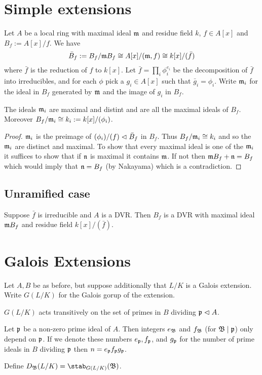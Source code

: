 \documentclass{memoir}
\begin{document}
\section{Simple extensions}
Let $A$ be a local ring with maximal ideal $\mathfrak{m}$ and residue field $k$, $f\in A[x]$ and $B_f := A[x]/f$.
We have
\begin{equation}
    \bar B_f := B_f/\mathfrak{m}B_f \cong A[x]/(\mathfrak{m}, f) \cong k[x]/(\bar f)
\end{equation}
where $\bar f$ is the reduction of $f$ to $k[x]$.
Let $\bar f = \prod_i\phi_i^{e_i}$ be the decomposition of $\bar f$ into irreducibles, and for each $\phi$ pick a $g_i\in A[x]$ such that $\bar g_i = \phi_i$.
Write $\mathfrak{m}_i$ for the ideal in $B_f$ generated by $\mathfrak{m}$ and the image of $g_i$ in $B_f$.
\begin{proposition}
    The ideals $\mathfrak{m}_i$ are maximal and distint and are all the maximal ideals of $B_f$.
    Moreover $B_f/\mathfrak{m}_i \cong k_i := k[x]/(\phi_i)$.
\end{proposition}
\begin{proof}
    $\mathfrak{m}_i$ is the preimage of $(\phi_i)/(f)\vartriangleleft \bar B_f$ in $B_f$.
    Thus $B_f/\mathfrak{m}_i \cong k_i$ and so the $\mathfrak{m}_i$ are distinct and maximal.
    To show that every maximal ideal is one of the $\mathfrak{m}_i$ it suffices to show that if $\mathfrak{n}$ is maximal it contains $\mathfrak{m}$.
    If not then $\mathfrak{m} B_f+\mathfrak{n} = B_f$ which would imply that $\mathfrak{n} = B_f$ (by Nakayama) which is a contradiction.
\end{proof}
\subsection{Unramified case}
Suppose $\bar f$ is irreducible and $A$ is a DVR.
Then $B_f$ is a DVR with maximal ideal $\mathfrak{m} B_f$ and residue field $k[x]/(\bar f)$.
\section{Galois Extensions}
Let $A,B$ be as before, but suppose additionally that $L/K$ is a Galois extension.
Write $G(L/K)$ for the Galois gorup of the extension.
\begin{proposition}
    $G(L/K)$ acts transitively on the set of primes in $B$ dividing $\mathfrak{p}\vartriangleleft A$.
\end{proposition}
\begin{corollary}
    Let $\mathfrak{p}$ be a non-zero prime ideal of $A$.
    Then integers $e_{\mathfrak{B}}$ and $f_{\mathfrak{B}}$ (for $\mathfrak{B}\mid \mathfrak{p}$) only depend on $\mathfrak{p}$.
    If we denote these numbers $e_{\mathfrak{p}}, f_{\mathfrak{p}}$, and $g_{\mathfrak{p}}$ for the number of prime ideals in $B$ dividing $\mathfrak{p}$ then $n = e_{\mathfrak{p}}f_{\mathfrak{p}}g_{\mathfrak{p}}$.
\end{corollary}
\begin{definition}
    Define $D_{\mf B}(L/K) = \stab_{G(L/K)}(\mf B)$.
\end{definition}
\end{document}
